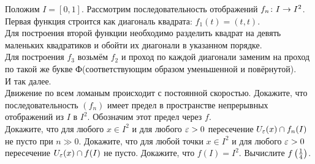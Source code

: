 \documentclass[a4paper,12pt]{article}
\begin{document}
Положим $I = [0,1]$. Рассмотрим последовательность отображений $f_n \colon I \rightarrow I^2$.\\
Первая функция строится как диагональ квадрата: $f_1(t) = (t,t)$.\\
Для построения второй функции необходимо разделить квадрат на девять маленьких квадратиков и обойти их диагонали в указанном порядке.\\
Для построения $f_3$ возьмём $f_2$ и проход по каждой диагонали заменим на проход по такой же  букве Ф (соответствующим образом уменьшенной и повёрнутой).\\
И так далее.\\
Движение по всем ломаным происходит с постоянной скоростью.
Докажите, что последовательность $(f_n)$ имеет предел в пространстве непрерывных отображений из $I$ в $I^2$. Обозначим этот предел через $f$.\\
Докажите, что для любого $x \in I^2$ и для любого $\varepsilon>0$ пересечение $U_{\varepsilon}(x) \cap f_n(I)$ не пусто при $n\gg0$.
Докажите, что для любой точки $x \in I^2$ и для любого $\varepsilon>0$ пересечение $U_{\varepsilon}(x) \cap f(I)$ не пусто.
Докажите, что $f(I) = I^2$.
Вычислите $f\left(\frac14\right)$.


\end{document}
